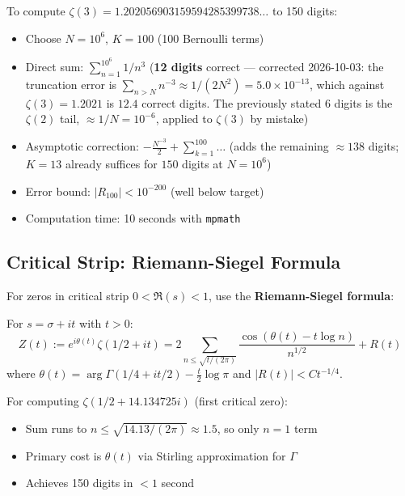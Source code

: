 \begin{example}
To compute $\zeta(3) = 1.202056903159594285399738\ldots$ to 150 digits:
\begin{itemize}
\item Choose $N = 10^6$, $K = 100$ (100 Bernoulli terms)
\item Direct sum: $\sum_{n=1}^{10^6} 1/n^3$ (\textbf{12 digits} correct ---
  corrected 2026-10-03: the truncation error is
  $\sum_{n>N} n^{-3} \approx 1/(2N^2) = 5.0\times10^{-13}$, which against
  $\zeta(3) = 1.2021$ is $12.4$ correct digits. The previously stated $6$ digits
  is the $\zeta(2)$ tail, $\approx 1/N = 10^{-6}$, applied to $\zeta(3)$ by
  mistake)
\item Asymptotic correction: $-\frac{N^{-3}}{2} + \sum_{k=1}^{100} \ldots$
  (adds the remaining $\approx 138$ digits; $K = 13$ already suffices for $150$
  digits at $N = 10^6$)
\item Error bound: $|R_{100}| < 10^{-200}$ (well below target)
\item Computation time: 10 seconds with \texttt{mpmath}
\end{itemize}
\end{example}

\subsection{Critical Strip: Riemann-Siegel Formula}

For zeros in critical strip $0 < \Re(s) < 1$, use the \textbf{Riemann-Siegel formula}:

\begin{thm}\label{thm:riemann-siegel}
For $s = \sigma + it$ with $t > 0$:
\begin{equation}
Z(t) := e^{i\theta(t)} \zeta(1/2 + it) = 2 \sum_{n \leq \sqrt{t/(2\pi)}} \frac{\cos(\theta(t) - t \log n)}{n^{1/2}} + R(t)
\end{equation}
where $\theta(t) = \arg \Gamma(1/4 + it/2) - \frac{t}{2}\log\pi$ and $|R(t)| < C t^{-1/4}$.
\end{thm}

\begin{remark}
For computing $\zeta(1/2 + 14.134725i)$ (first critical zero):
\begin{itemize}
\item Sum runs to $n \leq \sqrt{14.13/(2\pi)} \approx 1.5$, so only $n=1$ term
\item Primary cost is $\theta(t)$ via Stirling approximation for $\Gamma$
\item Achieves 150 digits in $< 1$ second
\end{itemize}
\end{remark}

